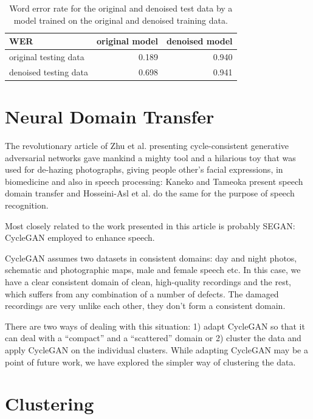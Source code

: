 \documentclass[conference]{IEEEtran}
\begin{document}
\begin{table}[htpb]
\caption{Word error rate for the original and denoised test data by a model trained
on the original and denoised training data.}\label{tab:results-denoise}
\centering
\begin{tabular}{|l||r|r|}
\hline
WER    & original model & denoised model \\
\hline
original testing data & 0.189 & 0.940 \\
denoised testing data & 0.698 & 0.941 \\
\hline
\end{tabular}
\end{table}

\section{Neural Domain Transfer}

The revolutionary article of Zhu et al.\cite{cyclegan} presenting
cycle-consistent generative adversarial networks gave mankind a mighty tool and
a hilarious toy that was used for de-hazing
photographs\cite{Engin_2018_CVPR_Workshops}, giving people other's facial
expressions\cite{jin2017faceoff}, in biomedicine\cite{yang2018biogan} and also
in speech processing: Kaneko and Tameoka\cite{kaneko2017parallel} present
speech domain transfer and Hosseini-Asl et al.\cite{hosseini2018malevoicegan} do
the same for the purpose of speech recognition.


Most closely related to the work presented in this article is probably
SEGAN\cite{pascual2017segan}: CycleGAN employed to enhance speech.

CycleGAN assumes two datasets in consistent domains: day and night photos,
schematic and photographic maps, male and female speech etc. In this case,
we have a clear consistent domain of clean, high-quality recordings and the
rest, which suffers from any combination of a number of defects. The damaged
recordings are very unlike each other, they don't form a consistent domain.

There are two ways of dealing with this situation: 1) adapt CycleGAN so that it
can deal with a ``compact'' and a ``scattered'' domain or 2) cluster the
data and apply CycleGAN on the individual clusters. While adapting CycleGAN may be a
point of future work, we have explored the simpler way of clustering the data.

\section{Clustering}
\end{document}

